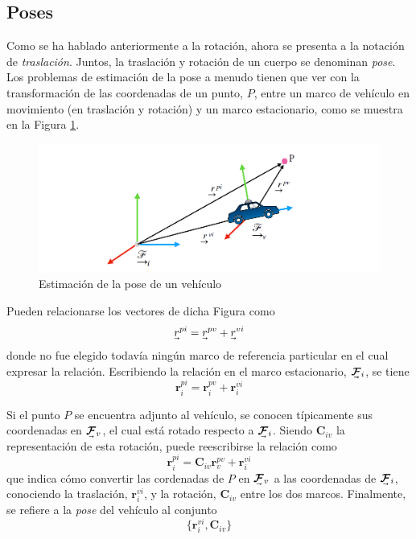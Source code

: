 

\subsection{Poses}
Como se ha hablado anteriormente a la rotación, ahora se presenta a la notación de \textit{traslación}. Juntos, la traslación y rotación de un cuerpo se denominan \textit{pose}. Los problemas de estimación de la pose a menudo tienen que ver con la transformación de las coordenadas de un punto, $P$, entre un marco de vehículo en movimiento (en traslación y rotación) y un marco estacionario, como se muestra en la Figura \ref{fig:pose}.
\begin{figure}[!b]
    \centering
    \includegraphics[width=\textwidth]{Img/Pose.png}
    \caption{Estimación de la pose de un vehículo}
    \label{fig:pose}
\end{figure}

Pueden relacionarse los vectores de dicha Figura como
\begin{equation}
    \undervec{r}^{pi} = \undervec{r}^{pv}+\undervec{r}^{vi}
\end{equation}
donde no fue elegido todavía ningún marco de referencia particular en el cual expresar la relación. Escribiendo la relación en el marco estacionario, $\undervec{\bm{\mathcal{F}}}_i$, se tiene
\begin{equation}
    \bm{r}_i^{pi} = \bm{r}_i^{pv} + \bm{r}_i^{vi}
\end{equation}

Si el punto $P$ se encuentra adjunto al vehículo, se conocen típicamente sus coordenadas en $\undervec{\bm{\mathcal{F}}}_v$, el cual está rotado respecto a $\undervec{\bm{\mathcal{F}}}_i$. Siendo $\bm{C}_{iv}$ la representación de esta rotación, puede reescribirse la relación como
\begin{equation}
    \bm{r}_i^{pi} = \bm{C}_{iv}\bm{r}_v^{pv} + \bm{r}_i^{vi}
    \label{eq:poseconvertion}
\end{equation}
que indica cómo convertir las cordenadas de $P$ en $\undervec{\bm{\mathcal{F}}}_v$ a las coordenadas de $\undervec{\bm{\mathcal{F}}}_i$, conociendo la traslación, $\bm{r}_i^{vi}$, y la rotación, $\bm{C}_{iv}$ entre los dos marcos. Finalmente, se refiere a la \textit{pose} del vehículo al conjunto
\begin{equation}
    \{\bm{r}_i^{vi},\bm{C}_{iv}\}
\end{equation}

